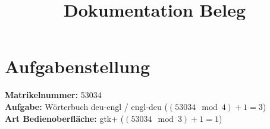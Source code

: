 


\title{Dokumentation Beleg}



\maketitle

\tableofcontents
\newpage

\section{Aufgabenstellung}
\textbf{Matrikelnummer:} 53034 \\
\textbf{Aufgabe:} Wörterbuch deu-engl / engl-deu ($(53034 \mod 4) + 1 = 3$) \\
\textbf{Art Bedienoberfläche:} gtk+ ($(53034 \mod 3) + 1 = 1$)

